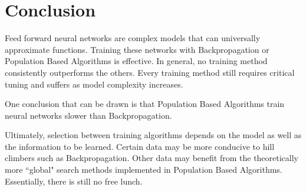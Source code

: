 \documentclass[twoside,11pt]{article}
\begin{document}
\section{Conclusion}

	Feed forward neural networks are complex models that can universally approximate functions. Training these networks with Backpropagation or Population Based Algorithms is effective. In general, no training method consistently outperforms the others. Every training method still requires critical tuning and suffers as model complexity increases.
	
	One conclusion that can be drawn is that Population Based Algorithms train neural networks slower than Backpropagation.
	
	Ultimately, selection between training algorithms depends on the model as well as the information to be learned. Certain data may be more conducive to hill climbers such as Backpropagation. Other data may benefit from the theoretically more ``global" search methods implemented in Population Based Algorithms. Essentially, there is still no free lunch.

\newpage


\end{document}
